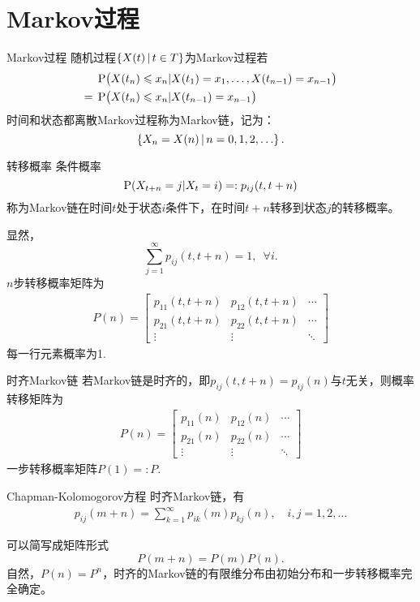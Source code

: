 \section{Markov过程}
\begin{definition}{Markov过程}{}
	随机过程$\set{X(t)}{t\in T}$为Markov过程若%
	\begin{align*}
		&\P\bigkh{X(t_n)\leqslant x_n|X(t_1)=x_1,\ldots,X(t_{n-1})=x_{n-1}}\\
		={}&\P\bigkh{X(t_n)\leqslant x_n|X(t_{n-1})=x_{n-1}}
	\end{align*}
	时间和状态都离散Markov过程称为Markov链，记为：
	\[
		\set{X_n=X(n)}{n=0,1,2,\ldots}.
	\]
\end{definition}
\begin{definition}{转移概率}{}
	条件概率 
	\[
		\P(X_{t+n}=j|X_t=i)=:p_{ij}(t,t+n)
	\]
	称为Markov链在时间$t$处于状态$i$条件下，在时间$t+n$转移到状态$j$的转移概率。
\end{definition}
显然，
\[
	\sum_{j=1}^\infty p_{ij}(t,t+n)=1,\enspace\forall i.
\]
$n$步转移概率矩阵为
\begin{align}
	P(n)=\begin{bmatrix}
		p_{11}(t,t+n)&p_{12}(t,t+n)&\cdots\\
		p_{21}(t,t+n)&p_{22}(t,t+n)&\cdots\\
		\vdots&\vdots&\ddots
	\end{bmatrix}
\end{align}
每一行元素概率为1.
\begin{definition}{时齐Markov链}{}
	若Markov链是时齐的，即$p_{ij}(t,t+n)=p_{ij}(n)$与$t$无关，则概率转移矩阵为
	\begin{align*}
		P(n)=\begin{bmatrix}
			p_{11}(n)&p_{12}(n)&\cdots\\
			p_{21}(n)&p_{22}(n)&\cdots\\
			\vdots&\vdots&\ddots
		\end{bmatrix}
	\end{align*}
	一步转移概率矩阵$P(1)=:P.$
\end{definition}
\begin{theorem}{Chapman-Kolomogorov方程}{}
	时齐Markov链，有
	\begin{align*}
		p_{ij}(m+n)=\sum_{k=1}^\infty p_{ik}(m)p_{kj}(n),\quad i,j=1,2,\ldots
	\end{align*}
\end{theorem}
可以简写成矩阵形式
\[
	P(m+n)=P(m)P(n).
\]
自然，$P(n)=P^n$，时齐的Markov链的有限维分布由初始分布和一步转移概率完全确定。
